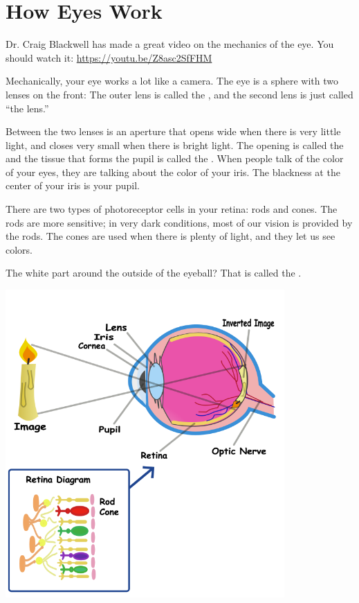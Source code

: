 \chapter{How Eyes Work}

Dr. Craig Blackwell has made a great video on the mechanics of the
eye. You should watch it: \url{https://youtu.be/Z8asc2SfFHM}

Mechanically, your eye works a lot like a camera.  The eye is a sphere
with two lenses on the front: The outer lens is called the , and the
second lens is just called ``the lens.''

Between the two lenses is an aperture that opens wide when there is
very little light, and closes very small when there is bright light.
The opening is called the  and the tissue that forms
the pupil is called the . When people talk of the color
of your eyes, they are talking about the color of your iris. The
blackness at the center of your iris is your pupil.

There are two types of photoreceptor cells in your retina: rods and
cones. The rods are more sensitive; in very dark conditions, most of
our vision is provided by the rods. The cones are used when there is
plenty of light, and they let us see colors.

The white part around the outside of the eyeball? That is called the
.

\includegraphics[width=0.8\textwidth]{eye.png}


